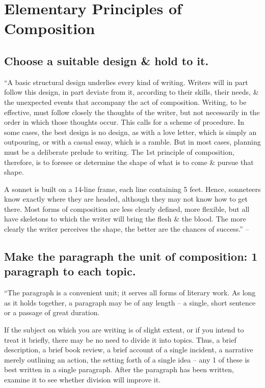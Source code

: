 \documentclass{article}
\numberwithin{equation}{section}
\begin{document}

\section{Elementary Principles of Composition}

\subsection{Choose a suitable design \& hold to it.}
``A basic structural design underlies every kind of writing. Writers will in part follow this design, in part deviate from it, according to their skills, their needs, \& the unexpected events that accompany the act of composition. Writing, to be effective, must follow closely the thoughts of the writer, but not necessarily in the order in which those thoughts occur. This calls for a scheme of procedure. In some cases, the best design is no design, as with a love letter, which is simply an outpouring, or with a casual essay, which is a ramble. But in most cases, planning must be a deliberate prelude to writing. The 1st principle of composition, therefore, is to foresee or determine the shape of what is to come \& pursue that shape.

A sonnet is built on a 14-line frame, each line containing 5 feet. Hence, sonneteers know exactly where they are headed, although they may not know how to get there. Most forms of composition are less clearly defined, more flexible, but all have skeletons to which the writer will bring the flesh \& the blood. The more clearly the writer perceives the shape, the better are the chances of success.'' -- \cite[p. 29]{Strunk_White2019}


\subsection{Make the paragraph the unit of composition: 1 paragraph to each topic.}
``The paragraph is a convenient unit; it serves all forms of literary work. As long as it holds together, a paragraph may be of any length -- a single, short sentence or a passage of great duration.

If the subject on which you are writing is of slight extent, or if you intend to treat it briefly, there may be no need to divide it into topics. Thus, a brief description, a brief book review, a brief account of a single incident, a narrative merely outlining an action, the setting forth of a single idea -- any 1 of these is best written in a single paragraph. After the paragraph has been written, examine it to see whether division will improve it.
\end{document}
